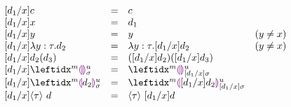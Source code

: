 \begin{figure}[!ht]
\[
\begin{array}{lcll}
[\dexp_1 / x] c
&=&
c\\
{[\dexp_1 / x] x}
&=&
\dexp_1\\
{[\dexp_1 / x] y}
&=&
y & (y \neq x)\\
{[\dexp_1 / x] \dlam{y}{\htau}{\dexp_2}}
&=&
{\dlam{y}{\htau}{[\dexp_1 / x] \dexp_2}}
& (y \neq x)
\\
{[\dexp_1 / x] \dap{d_2}{d_3}}
&=&
{\dapP{[\dexp_1 / x] d_2}{[\dexp_1 / x] d_3}}
\\
{[\dexp_1 / x]} \dehole{\mvar}{\subst}{m}
&=&
\dehole{\mvar}{[\dexp_1 / x] \subst}{m}
\\
{[\dexp_1 / x] \dhole{\dexp_2}{\mvar}{\subst}{m}}
&=&
\dhole{ [ \dexp_1 / x ] \dexp_2 }{\mvar}{[\dexp_1 / x] \subst}{m}
\\
{[\dexp_1 / x] \dcast{\htau}{\dexp}}
&=&
\dcast{\htau}{[\dexp_1 / x] \dexp}
\end{array}
\]
\end{figure}

